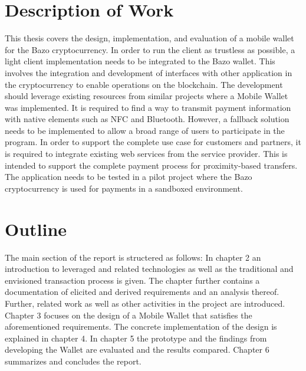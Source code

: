 \section{Description of Work}
This thesis covers the design, implementation, and evaluation of a mobile wallet for the Bazo cryptocurrency. In order to run the client as trustless as possible, a light client implementation needs to be integrated to the Bazo wallet. This involves the integration and development of interfaces with other application in the cryptocurrency to enable operations on the blockchain.
The development should leverage existing resources from similar projects where a Mobile Wallet was implemented.
It is required to find a way to transmit payment information with native elements such as NFC and Bluetooth. However, a fallback solution needs to be implemented to allow a broad range of users to participate in the program.
In order to support the complete use case for customers and partners, it is required to integrate existing web services from the service provider. This is intended to support the complete payment process for proximity-based transfers.
The application needs to be tested in a pilot project where the Bazo cryptocurrency is used for payments in a sandboxed environment.

\section{Outline}
The main section of the report is structered as follows:
In chapter 2 an introduction to leveraged and related technologies as well as the traditional and envisioned transaction process is given. The chapter further contains a documentation of elicited and derived requirements and an analysis thereof. Further, related work as well as other activities in the project are introduced. Chapter 3 focuses on the design of a Mobile Wallet that satisfies the aforementioned requirements. The concrete implementation of the design is explained in chapter 4. In chapter 5 the prototype and the findings from developing the Wallet are evaluated and the results compared.
Chapter 6 summarizes and concludes the report.